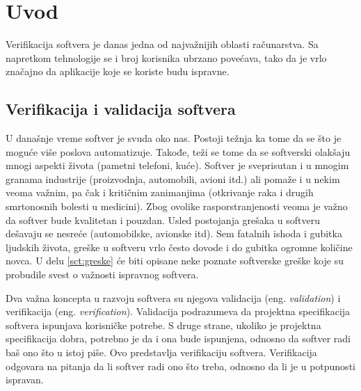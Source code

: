 \documentclass[12pt,oneside]{memoir}
\begin{document}
\frontmatter
\naslovna
\komisija
\apstrakt
\tableofcontents*

\mainmatter

\chapter{Uvod}
Verifikacija softvera je danas jedna od najvažnijih oblasti računarstva. Sa napretkom tehnologije se i broj korisnika ubrzano povećava, tako da je vrlo značajno da aplikacije koje se koriste budu ispravne.

\section{Verifikacija i validacija softvera}
U današnje vreme softver je svuda oko nas. Postoji težnja ka tome da se što je moguće više poslova automatizuje. Takođe, teži se tome da se softverski olakšaju mnogi aspekti života (pametni telefoni, kuće). Softver je sveprisutan i u mnogim granama industrije (proizvodnja, automobili, avioni itd.) ali pomaže i u nekim veoma važnim, pa čak i kritičnim zanimanjima (otkrivanje raka i drugih smrtonosnih bolesti u medicini). Zbog ovolike rasporstranjenosti veoma je važno da softver bude kvalitetan i pouzdan. Usled postojanja grešaka u softveru dešavaju se nesreće (automobilske, avionske itd). Sem fatalnih ishoda i gubitka ljudskih života, greške u softveru vrlo često dovode i do gubitka ogromne količine novca. U delu \ref{sct:greske} će biti opisane neke poznate softverske greške koje su probudile svest o važnosti ispravnog softvera. 

Dva važna koncepta u razvoju softvera su njegova validacija (eng. \textit{validation}) i verifikacija (eng. \textit{verification}). Validacija podrazumeva da projektna specifikacija softvera ispunjava korisničke potrebe. S druge strane, ukoliko je projektna specifikacija dobra, potrebno je da i ona bude ispunjena, odnosno da softver radi baš ono što u istoj piše. Ovo predstavlja verifikaciju softvera. Verifikacija odgovara na pitanja da li softver radi ono što treba, odnosno da li je u potpunosti ispravan. 
 
\end{document}
